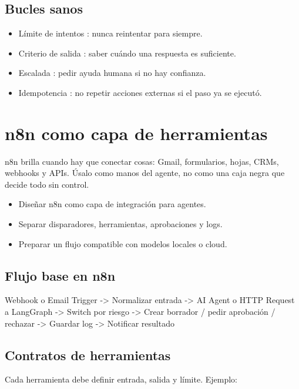 \documentclass[11pt,a4paper]{book}
\begin{document}
\section{Bucles sanos}
\begin{itemize}\item Límite de intentos : nunca reintentar para siempre.\end{itemize}
\begin{itemize}\item Criterio de salida : saber cuándo una respuesta es suficiente.\end{itemize}
\begin{itemize}\item Escalada : pedir ayuda humana si no hay confianza.\end{itemize}
\begin{itemize}\item Idempotencia : no repetir acciones externas si el paso ya se ejecutó.\end{itemize}
\chapter{n8n como capa de herramientas}
n8n brilla cuando hay que conectar cosas: Gmail, formularios, hojas, CRMs, webhooks y APIs. Úsalo como manos del agente, no como una caja negra que decide todo sin control.

\begin{itemize}\item Diseñar n8n como capa de integración para agentes.\end{itemize}
\begin{itemize}\item Separar disparadores, herramientas, aprobaciones y logs.\end{itemize}
\begin{itemize}\item Preparar un flujo compatible con modelos locales o cloud.\end{itemize}
\section{Flujo base en n8n}
\begin{codebox}
Webhook o Email Trigger
  -> Normalizar entrada
  -> AI Agent o HTTP Request a LangGraph
  -> Switch por riesgo
  -> Crear borrador / pedir aprobación / rechazar
  -> Guardar log
  -> Notificar resultado
\end{codebox}
\section{Contratos de herramientas}
Cada herramienta debe definir entrada, salida y límite. Ejemplo:
\end{document}
